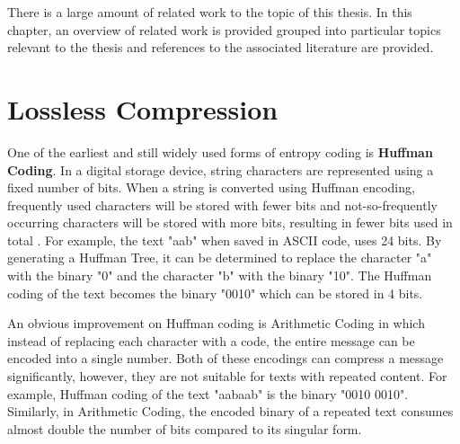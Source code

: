 \label{chapter:related}

\newlength{\savedunitlength}
\setlength{\unitlength}{2em}

There is a large amount of related work to the topic of this thesis. In this chapter, an overview of related work is provided grouped 
into particular topics relevant to the thesis and references to the associated literature are provided. 


\section{Lossless Compression}
\label{sec:lossless-compression}

One of the earliest and still widely used forms of entropy coding is \textbf{Huffman Coding}. In a digital storage device, string characters are represented using a fixed number of bits. When a string is converted using Huffman encoding, frequently used characters will be stored with fewer bits and not-so-frequently occurring characters will be stored with more bits, resulting in fewer bits used in total \cite{Huffman1952IRE}. For example, the text "aab" when saved in ASCII code, uses 24 bits. By generating a Huffman Tree, it can be determined to replace the character "a" with the binary "0" and the character "b" with the binary "10". The Huffman coding of the text becomes the binary "0010" which can be stored in 4 bits.

An obvious improvement on Huffman coding is Arithmetic Coding in which instead of replacing each character with a code, the entire message can be encoded into a single number\cite{rissanen1976arithmetic}. Both of these encodings can compress a message significantly, however, they are not suitable for texts with repeated content. For example, Huffman coding of the text "aabaab" is the binary "0010 0010". Similarly, in Arithmetic Coding, the encoded binary of a repeated text consumes almost double the number of bits compared to its singular form.

